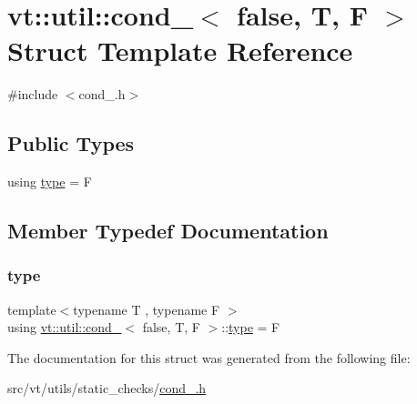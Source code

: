 \hypertarget{structvt_1_1util_1_1cond___3_01false_00_01_t_00_01_f_01_4}{}\section{vt\+:\+:util\+:\+:cond\+\_\+$<$ false, T, F $>$ Struct Template Reference}
\label{structvt_1_1util_1_1cond___3_01false_00_01_t_00_01_f_01_4}


{\ttfamily \#include $<$cond\+\_\+.\+h$>$}

\subsection*{Public Types}
\begin{DoxyCompactItemize}
\item 
using \hyperlink{structvt_1_1util_1_1cond___3_01false_00_01_t_00_01_f_01_4_a0e8210e2bf4aa9bb68f76e767cd26743}{type} = F
\end{DoxyCompactItemize}


\subsection{Member Typedef Documentation}
\mbox{\label{structvt_1_1util_1_1cond___3_01false_00_01_t_00_01_f_01_4_a0e8210e2bf4aa9bb68f76e767cd26743}} 
\subsubsection{\texorpdfstring{type}{type}}
{\footnotesize\ttfamily template$<$typename T , typename F $>$ \\
using \hyperlink{structvt_1_1util_1_1cond__}{vt\+::util\+::cond\+\_\+}$<$ false, T, F $>$\+::\hyperlink{structvt_1_1util_1_1cond___3_01false_00_01_t_00_01_f_01_4_a0e8210e2bf4aa9bb68f76e767cd26743}{type} =  F}



The documentation for this struct was generated from the following file\+:\begin{DoxyCompactItemize}
\item 
src/vt/utils/static\+\_\+checks/\hyperlink{cond___8h}{cond\+\_\+.\+h}\end{DoxyCompactItemize}
